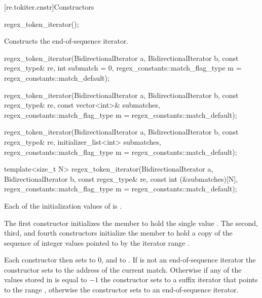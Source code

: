 [re.tokiter.cnstr]{Constructors}

%
\begin{itemdecl}
regex_token_iterator();
\end{itemdecl}

\begin{itemdescr}
\pnum
\effects
Constructs the end-of-sequence iterator.
\end{itemdescr}

%
\begin{itemdecl}
regex_token_iterator(BidirectionalIterator a, BidirectionalIterator b,
                     const regex_type& re,
                     int submatch = 0,
                     regex_constants::match_flag_type m = regex_constants::match_default);

regex_token_iterator(BidirectionalIterator a, BidirectionalIterator b,
                     const regex_type& re,
                     const vector<int>& submatches,
                     regex_constants::match_flag_type m = regex_constants::match_default);

regex_token_iterator(BidirectionalIterator a, BidirectionalIterator b,
                     const regex_type& re,
                     initializer_list<int> submatches,
                     regex_constants::match_flag_type m = regex_constants::match_default);

template<size_t N>
  regex_token_iterator(BidirectionalIterator a, BidirectionalIterator b,
                       const regex_type& re,
                       const int (&submatches)[N],
                       regex_constants::match_flag_type m = regex_constants::match_default);
\end{itemdecl}

\begin{itemdescr}
\pnum
\expects
Each of the initialization values of  is .

\pnum
\effects
The first constructor initializes the member  to hold the single
value .
The second, third, and fourth constructors
initialize the member  to hold a copy of the sequence of integer values
pointed to by the iterator range
.

\pnum
Each constructor then sets  to 0, and  to
. If  is not an
end-of-sequence iterator the constructor sets  to the
address of the current match. Otherwise if any of the values stored
in  is equal to $-1$ the constructor sets  to a suffix
iterator that points to the range , otherwise the constructor
sets  to an end-of-sequence iterator.
\end{itemdescr}

